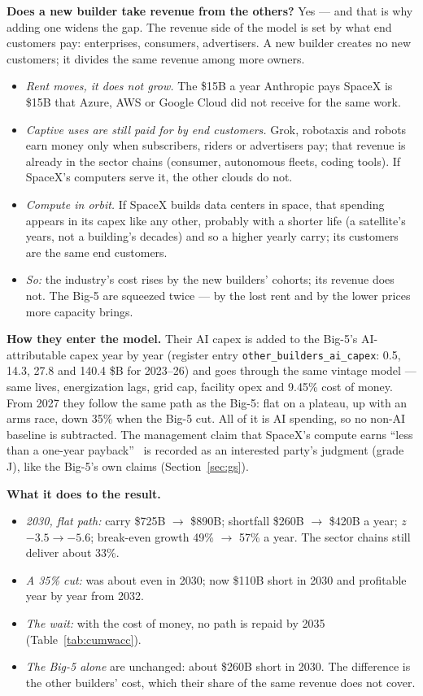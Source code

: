 \documentclass[11pt,letterpaper]{article}
\newcommand{\lead}[1]{{\color{leadwarm}\sffamily\bfseries #1}}
\begin{document}
\lead{Does a new builder take revenue from the others?} Yes --- and that is why adding one widens the gap. The revenue side of the model is set by what end customers pay: enterprises, consumers, advertisers. A new builder creates no new customers; it divides the same revenue among more owners.
\begin{itemize}
\item \emph{Rent moves, it does not grow.} The \$15B a year Anthropic pays SpaceX is \$15B that Azure, AWS or Google Cloud did not receive for the same work.
\item \emph{Captive uses are still paid for by end customers.} Grok, robotaxis and robots earn money only when subscribers, riders or advertisers pay; that revenue is already in the sector chains (consumer, autonomous fleets, coding tools). If SpaceX's computers serve it, the other clouds do not.
\item \emph{Compute in orbit.} If SpaceX builds data centers in space, that spending appears in its capex like any other, probably with a shorter life (a satellite's years, not a building's decades) and so a higher yearly carry; its customers are the same end customers.
\item \emph{So:} the industry's cost rises by the new builders' cohorts; its revenue does not. The Big-5 are squeezed twice --- by the lost rent and by the lower prices more capacity brings.
\end{itemize}

\lead{How they enter the model.} Their AI capex is added to the Big-5's AI-attributable capex year by year (register entry \texttt{other\_builders\_ai\_capex}: 0.5, 14.3, 27.8 and 140.4 \$B for 2023--26) and goes through the same vintage model --- same lives, energization lags, grid cap, facility opex and 9.45\% cost of money. From 2027 they follow the same path as the Big-5: flat on a plateau, up with an arms race, down 35\% when the Big-5 cut. All of it is AI spending, so no non-AI baseline is subtracted. The management claim that SpaceX's compute earns ``less than a one-year payback''~\cite{ref:baxtel_spacex_q2} is recorded as an interested party's judgment (grade J), like the Big-5's own claims (Section~\ref{sec:gs}).

\lead{What it does to the result.}
\begin{itemize}
\item \emph{2030, flat path:} carry \$725B $\to$ \$890B; shortfall \$260B $\to$ \$420B a year; $z$ $-3.5\to-5.6$; break-even growth 49\% $\to$ 57\% a year. The sector chains still deliver about 33\%.
\item \emph{A 35\% cut:} was about even in 2030; now \$110B short in 2030 and profitable year by year from 2032.
\item \emph{The wait:} with the cost of money, no path is repaid by 2035 (Table~\ref{tab:cumwacc}).
\item \emph{The Big-5 alone} are unchanged: about \$260B short in 2030. The difference is the other builders' cost, which their share of the same revenue does not cover.
\end{itemize}
\end{document}
